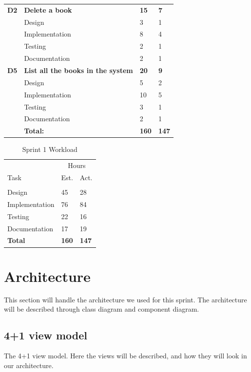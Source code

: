\begin{table}
\begin{tabular}{ l p{8cm} l l }
\bf{D2}	  &\bf{Delete a book}				&\bf{15}		&\bf{7}		     \\
		  &Design							&3			&1		\\
		  &Implementation					&8			&4		\\
		  &Testing						&2			&1		\\
		  &Documentation					&2			&1		\\

 \bf{D5}	  &\bf{List all the books in the system}	&\bf{20}		&\bf{9}		     \\
		  &Design							&5			&2		\\
		  &Implementation					&10			&5		\\
		  &Testing						&3			&1		\\
		  &Documentation					&2			&1		\\
\hline 
		  &\bf{Total:}						&\bf{160}		&\bf{147}		\\
\hline
\end{tabular}
\label{table:sp1usrstories}
\end{table}

\begin{table}
\caption{Sprint 1 Workload}
\centering
\begin{tabular}{ l l l }
\hline 
			&\multicolumn{2}{c}{Hours}			\\
 Task		&Est.			&Act.	                               \\ 
\hline \\ [-2.0ex]
Design			&45		&28		\\
Implementation	&76		&84		\\
Testing			&22		&16		\\
Documentation	&17		&19		\\
\hline
\bf{Total}			&\bf{160}	&\bf{147}		\\
\hline
\end{tabular}
\label{table:sp1workload}
\end{table}


\section{Architecture}
This section will handle the architecture we used for this sprint. The architecture will be described through class diagram and component diagram.


\subsection{4+1 view model}
The 4+1 view model. Here the views will be described, and how they will look in our architecture. 

